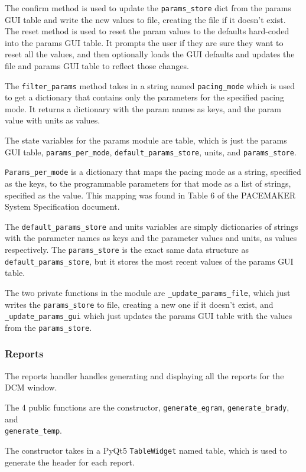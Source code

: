 \documentclass[12pt]{article}
\begin{document}
The confirm method is used to update the \verb|params_store| dict from the params GUI table and write the new values to file, creating the file if it doesn't exist. The reset method is used to reset the param values to the defaults hard-coded into the params GUI table. It prompts the user if they are sure they want to reset all the values, and then optionally loads the GUI defaults and updates the file and params GUI table to reflect those changes.

The \verb|filter_params| method takes in a string named \verb|pacing_mode| which is used to get a dictionary that contains only the parameters for the specified pacing mode. It returns a dictionary with the param names as keys, and the param value with units as values.

The state variables for the params module are table, which is just the params GUI table, \verb|params_per_mode|, \verb|default_params_store|, units, and \verb|params_store|.

\verb|Params_per_mode| is a dictionary that maps the pacing mode as a string, specified as the keys, to the programmable parameters for that mode as a list of strings, specified as the value. This mapping was found in Table 6 of the PACEMAKER System Specification document.

The \verb|default_params_store| and units variables are simply dictionaries of strings with the parameter names as keys and the parameter values and units, as values respectively. The \verb|params_store| is the exact same data structure as \verb|default_params_store|, but it stores the most recent values of the params GUI table.

The two private functions in the module are \verb|_update_params_file|, which just writes the \verb|params_store| to file, creating a new one if it doesn't exist, and \verb|_update_params_gui| which just updates the params GUI table with the values from the \verb|params_store|.

\subsubsection{Reports}
The reports handler handles generating and displaying all the reports for the DCM window.

The 4 public functions are the constructor, \verb|generate_egram|, \verb|generate_brady|, and \\ \verb|generate_temp|.

The constructor takes in a PyQt5 \verb|TableWidget| named table, which is used to generate the header for each report.
\end{document}
